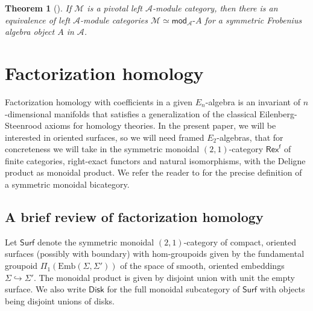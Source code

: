 \documentclass[11pt]{article}
\newtheorem{theorem}{Theorem}[section]
\theoremstyle{definition}
\begin{document}
\begin{theorem}[{\cite[Corollary 3.16]{relserre}}]
If $\mathcal{M}$ is a pivotal left $\mathcal{A}$-module category, then there is an equivalence of left $\mathcal{A}$-module categories $\mathcal{M} \simeq \mathsf{mod}_\mathcal{A} \text{-}A$ for a symmetric Frobenius algebra object $A$ in $\mathcal{A}$.
\end{theorem}









\section{Factorization homology}	



Factorization homology \cite{higheralgebra,AF} with coefficients in a given $E_n$-algebra is an invariant of $n$-dimensional manifolds that satisfies a generalization of the classical Eilenberg-Steenrood axioms for homology theories. In the present paper, we will be interested in oriented surfaces, so we will need framed $E_2$-algebras, that for concreteness we will take in the symmetric monoidal $(2,1)$-category $\mathsf{Rex}^\mathsf{f}$ of finite categories, right-exact functors and natural isomorphisms, with the Deligne product as monoidal product. We refer the reader to \cite[Chapter 2]{schommerpries} for the precise definition of a symmetric monoidal bicategory.



\subsection{A brief review of factorization homology}\label{subsec:review_FH}



Let $\mathsf{Surf}$ denote the symmetric monoidal $(2,1)$-category of compact, oriented surfaces (possibly with boundary) with hom-groupoids given by the fundamental groupoid $\Pi_1(\mathrm{Emb}(\Sigma, \Sigma'))$ of the space of smooth, oriented embeddings $\Sigma \hookrightarrow \Sigma'$. The monoidal product is given by disjoint union with unit the empty surface. We also write $\mathsf{Disk}$ for the full monoidal subcategory of $\mathsf{Surf}$ with objects being disjoint unions of disks.
\end{document}
